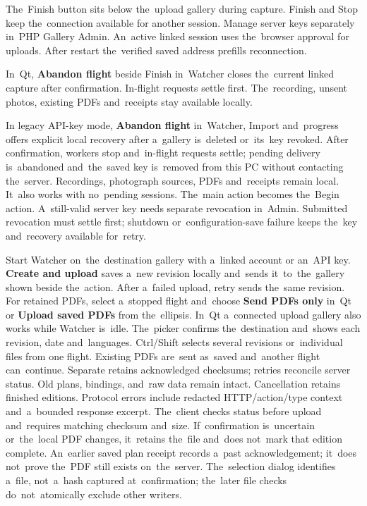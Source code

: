 \documentclass[11pt,a4paper]{article}
\newcommand{\filepath}[1]{\path{#1}}
\newcommand{\ui}[1]{\textbf{#1}}
\begin{document}
The~Finish button sits below the~upload gallery during capture. Finish and
Stop keep the~connection available for another session. Manage server keys
separately in~PHP Gallery Admin. An~active linked session uses the~browser
approval for uploads. After restart the~verified saved address prefills
reconnection.

In~Qt, \ui{Abandon flight} beside Finish in~Watcher closes the~current linked
capture after confirmation. In-flight requests settle first. The~recording,
unsent photos, existing PDFs and~receipts stay available locally.

In legacy API-key mode, \ui{Abandon flight} in~Watcher, Import and~progress
offers explicit local recovery after a~gallery is~deleted or~its~key revoked.
After confirmation, workers stop and~in-flight requests settle; pending delivery
is~abandoned and~the~saved key is~removed from this PC without contacting
the~server. Recordings, photograph sources, PDFs and~receipts remain local.
It~also works with no~pending sessions. The~main action becomes
the~Begin action. A~still-valid server key needs separate revocation in~Admin.
Submitted revocation must settle first; shutdown or~configuration-save failure
keeps the~key and~recovery available for~retry.

Start Watcher on~the~destination gallery with a~linked account or an~API key.
\ui{Create and upload} saves a~new revision locally and~sends it~to~the~gallery
shown beside the~action. After a~failed upload, retry sends the~same revision.
For retained PDFs, select a~stopped flight and~choose \ui{Send PDFs only}
in~Qt or \ui{Upload saved PDFs} from the~ellipsis. In~Qt a~connected upload
gallery also works while Watcher is~idle. The~picker confirms the~destination
and~shows each revision, date and~languages.
Ctrl/Shift selects several revisions or~individual files from one flight.
Existing PDFs are~sent as~saved and~another flight can~continue. Separate
\filepath{upload-receipts.json} retains acknowledged checksums; retries
reconcile
server status. Old plans, bindings, and~raw data remain intact. Cancellation
retains finished editions. Protocol errors include redacted HTTP/action/type
context and~a~bounded response excerpt.
The~client checks status before upload and~requires matching checksum and~size.
If~confirmation is~uncertain or~the~local PDF changes, it~retains the~file
and~does not~mark that edition complete. An~earlier saved plan receipt records
a~past acknowledgement; it~does not~prove the~PDF still exists on~the~server.
The~selection dialog identifies a~file, not~a~hash captured at~confirmation;
the~later file checks do~not~atomically exclude other writers.
\end{document}

